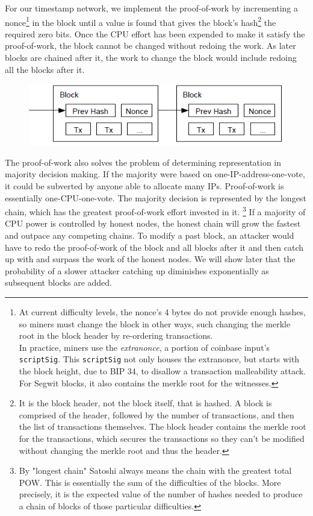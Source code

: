 \documentclass[nohyper]{tufte-handout}
\begin{document}
For our timestamp network, we implement the proof-of-work by
incrementing a nonce\footnote[][-1in]{At current difficulty levels, the nonce's 4 bytes do not provide enough hashes, so miners must change the block in other ways, such changing the merkle root in the block header by re-ordering transactions.\\In practice, miners use the \emph{extranonce}, a portion of coinbase input's \texttt{scriptSig}.  This \texttt{scriptSig} not only houses the extranonce, but starts with the block height, due to BIP 34, to disallow a transaction malleability attack.  For Segwit blocks, it also contains the merkle root for the witnesses.} in the block until a value is found that gives the
block's hash\footnote[][0.1in]{It is the block header, not the block itself, that is hashed.  A block is comprised of the header, followed by the number of transactions, and then the list of transactions themselves.  The block header contains the merkle root for the transactions, which secures the transactions so they can't be modified without changing the merkle root and thus the header.} the required zero bits. Once the CPU effort has been
expended to make it satisfy the proof-of-work, the block cannot be
changed without redoing the work. As later blocks are chained after it,
the work to change the block would include redoing all the blocks after
it.

\begin{figure}[!h]
\centering
\includegraphics[width=0.75\linewidth]{proof-of-work.png}
\end{figure}

The proof-of-work also solves the problem of determining representation
in majority decision making. If the majority were based on
one-IP-address-one-vote, it could be subverted by anyone able to
allocate many IPs. Proof-of-work is essentially one-CPU-one-vote. The
majority decision is represented by the longest chain, which has the greatest proof-of-work effort invested in it.  \footnote{By "longest chain" Satoshi always means the chain with the greatest total POW.  This is essentially the sum of the difficulties of the blocks.  More precisely, it is the expected value of the number of hashes needed to produce a chain of blocks of those particular difficulties.} If a majority of CPU power is controlled by honest nodes, the honest chain will grow the fastest and outpace any competing chains. To modify a past block, an attacker would have to redo the proof-of-work of the block and all blocks after
it and then catch up with and surpass the work of the honest nodes. We will show later that the probability of a slower attacker catching up
diminishes exponentially as subsequent blocks are added.
\end{document}
